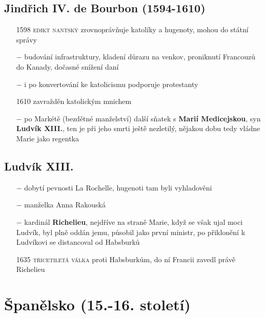 \documentclass{article}
\begin{document}
\subsection*{Jindřich IV. de Bourbon (1594-1610)}
\begin{itemize}
    \vspace{-0.5em}
    \setlength\itemsep{0.15em}
    \item[1598] \textsc{edikt nantský} zrovnoprávňuje katolíky a hugenoty, mohou do státní správy
    \item[$-$] budování infrastruktury, kladení důrazu na venkov, proniknutí Francouzů do Kanady, dočasné snížení daní
    \item[$-$] i po konvertování ke katolicismu podporuje protestanty
    \item[1610] zavražděn katolickým mnichem
    \item[$-$] po Markétě (bezdětné manželství) další sňatek s \textbf{Marií Medicejskou}, syn \textbf{Ludvík XIII.}, ten je při jeho smrti ještě nezletilý, nějakou dobu tedy vládne Marie jako regentka
\end{itemize}


\subsection*{Ludvík XIII.}
\begin{itemize}
    \vspace{-0.5em}
    \setlength\itemsep{0.15em}
    \item[$-$] dobytí pevnosti La Rochelle, hugenoti tam byli vyhladověni
    \item[$-$] manželka Anna Rakouská
    \item[$-$] kardinál \textbf{Richelieu}, nejdříve na straně Marie, když se však ujal moci Ludvík, byl plně oddán jemu, působil jako první ministr, po přiklonění k Ludvíkovi se distancoval od Habsburků
    \item[1635] \textsc{třicetiletá válka} proti Habsburkům, do ní Francii zavedl právě Richelieu
\end{itemize}

\section*{Španělsko (15.-16. století)}
\end{document}
